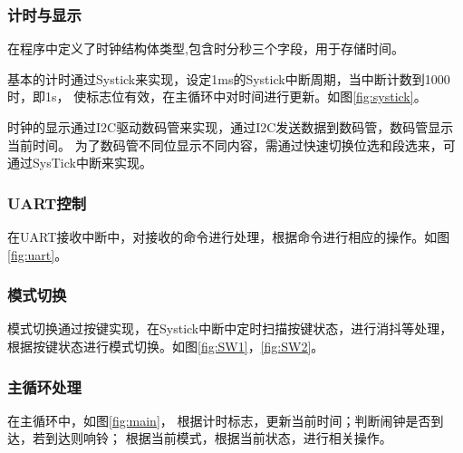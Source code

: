 \documentclass[12pt, a4paper, oneside]{ctexart}
\begin{document}
    \subsubsection{计时与显示}
    在程序中定义了时钟结构体类型,包含时分秒三个字段，用于存储时间。

    基本的计时通过Systick来实现，设定1ms的Systick中断周期，当中断计数到1000时，即1s，
    使标志位有效，在主循环中对时间进行更新。如图\ref{fig:systick}。

    时钟的显示通过I2C驱动数码管来实现，通过I2C发送数据到数码管，数码管显示当前时间。
    为了数码管不同位显示不同内容，需通过快速切换位选和段选来，可通过SysTick中断来实现。

   

    \subsubsection{UART控制}
    在UART接收中断中，对接收的命令进行处理，根据命令进行相应的操作。如图\ref{fig:uart}。

    \subsubsection{模式切换}
    模式切换通过按键实现，在Systick中断中定时扫描按键状态，进行消抖等处理，
    根据按键状态进行模式切换。如图\ref{fig:SW1}，\ref{fig:SW2}。
   

    \subsubsection{主循环处理}
    在主循环中，如图\ref{fig:main}，
    根据计时标志，更新当前时间；判断闹钟是否到达，若到达则响铃；
    根据当前模式，根据当前状态，进行相关操作。
\end{document}
